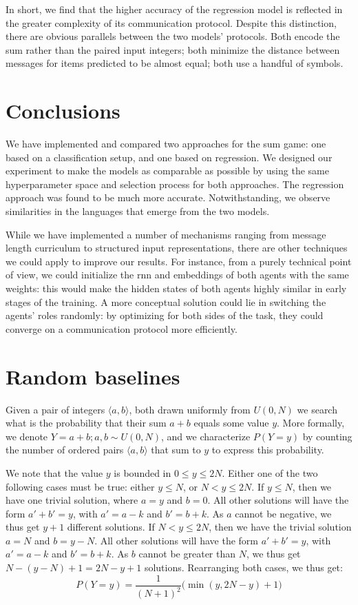 \documentclass[twocolumn]{article}
\begin{document}
In short, we find that the higher accuracy of the regression model is reflected in the greater complexity of its communication protocol.
Despite this distinction, there are obvious parallels between the two models' protocols.
Both encode the sum rather than the paired input integers; both minimize the distance between messages for items predicted to be almost equal; both use a handful of symbols.

\section{Conclusions}
We have implemented and compared two approaches for the sum game: one based on a classification setup, and one based on regression.
We designed our experiment to make the models as comparable as possible by using the same hyperparameter space and selection process for both approaches.
The regression approach was found to be much more accurate.
Notwithstanding, we observe similarities in the languages that emerge from the two models.

While we have implemented a number of mechanisms ranging from message length curriculum to structured input representations, there are other techniques we could apply to improve our results.
For instance, from a purely technical point of view, we could initialize the {\sc rnn} and embeddings of both agents with the same weights: this would make the hidden states of both agents highly similar in early stages of the training.
A more conceptual solution could lie in switching the agents' roles randomly: by optimizing for both sides of the task, they could converge on a communication protocol more efficiently.

\appendix

\section{Random baselines} \label{sec:baselines}

Given a pair of integers $\langle a,b \rangle$, both drawn uniformly from $U(0, N)$ we search what is the probability that their sum $a+b$ equals some value $y$.
More formally, we denote $Y = a+b ; a, b \sim U(0, N)$, and we characterize $P(Y=y)$ by counting the number of ordered pairs $\langle a,b \rangle$ that sum to $y$ to express this probability.

We note that the value $y$ is bounded in $0 \leq y \leq 2N$. 
Either one of the two following cases must be true: either $y \leq N$, or $N < y \leq 2N$.
If  $y \leq N$, then we have one trivial solution, where $a=y$ and $b=0$. 
All other solutions will have the form $a'+b'=y$, with $a'=a-k$ and $b'=b+k$.
As $a$ cannot be negative, we thus get $y+1$ different solutions.
If $N < y \leq 2N$, then we have the trivial solution $a=N$ and $b=y-N$.
All other solutions will have the form $a'+b'=y$, with $a'=a-k$ and $b'=b+k$.
As $b$ cannot be greater than $N$, we thus get $N - (y - N) + 1= 2N - y + 1$ solutions.
Rearranging both cases, we thus get:
\begin{equation*}
    P(Y=y) = \frac{1}{(N+1)^2}\bigg(\min(y, 2N - y) + 1\bigg)
\end{equation*}
\end{document}
